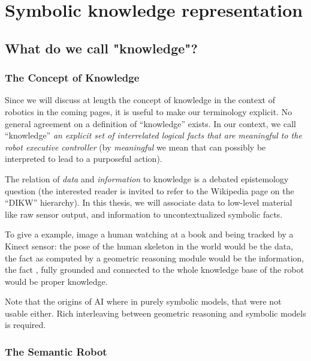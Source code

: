 \chapter{Symbolic knowledge representation}
\label{chapt|krs}


\section{What do we call "knowledge"?}
\label{sect|on-knowledge}

\subsection{The Concept of Knowledge}
\label{sect|knowledge}


Since we will discuss at length the concept of knowledge in the context
of robotics in the coming pages, it is useful to make our terminology explicit.  No general
agreement on a definition of ``knowledge'' exists. In our context, we call
``knowledge'' \emph{an explicit set of interrelated logical facts that are
meaningful to the robot executive controller} (by \emph{meaningful} we mean
that can possibly be interpreted to lead to a purposeful action).

The relation of \emph{data} and \emph{information} to knowledge is a debated
epistemology question (the interested reader is invited to refer to the
Wikipedia page on the ``DIKW'' hierarchy). In this thesis, we will associate
data to low-level material like raw sensor output, and information to
uncontextualized symbolic facts.

To give a example, image a human watching at a book and being tracked by a
Kinect sensor: the pose of the human skeleton in the world would be the data,
the fact  as computed by a geometric reasoning
module would be the information, the fact , fully grounded and connected to the whole knowledge base of
the robot would be proper knowledge.

Note that the origins of AI where in purely symbolic models, that were
not usable either. Rich interleaving between geometric reasoning and symbolic
models is required.

\subsection{The Semantic Robot}
\label{sect|semantic}


